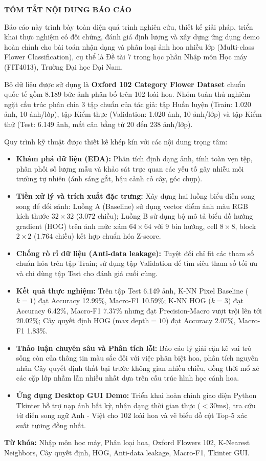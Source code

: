 \documentclass[../DoAn.tex]{subfiles}
\begin{document}
\begin{center}
    \Large{\textbf{TÓM TẮT NỘI DUNG BÁO CÁO}}
\end{center}
\vspace{0.8cm}

Báo cáo này trình bày toàn diện quá trình nghiên cứu, thiết kế giải pháp, triển khai thực nghiệm có đối chứng, đánh giá định lượng và xây dựng ứng dụng demo hoàn chỉnh cho bài toán nhận dạng và phân loại ảnh hoa nhiều lớp (Multi-class Flower Classification), cụ thể là Đề tài 7 trong học phần Nhập môn Học máy (FIT4013), Trường Đại học Đại Nam.

Bộ dữ liệu được sử dụng là \textbf{Oxford 102 Category Flower Dataset} chuẩn quốc tế gồm 8.189 bức ảnh phân bố trên 102 loài hoa. Nhóm tuân thủ nghiêm ngặt cấu trúc phân chia 3 tập chuẩn của tác giả: tập Huấn luyện (Train: 1.020 ảnh, 10 ảnh/lớp), tập Kiểm thực (Validation: 1.020 ảnh, 10 ảnh/lớp) và tập Kiểm thử (Test: 6.149 ảnh, mất cân bằng từ 20 đến 238 ảnh/lớp).

Quy trình kỹ thuật được thiết kế khép kín với các nội dung trọng tâm:
\begin{itemize}
    \item \textbf{Khám phá dữ liệu (EDA):} Phân tích định dạng ảnh, tính toàn vẹn tệp, phân phối số lượng mẫu và khảo sát trực quan các yếu tố gây nhiễu môi trường tự nhiên (ánh sáng gắt, hậu cảnh cỏ cây, góc chụp).
    \item \textbf{Tiền xử lý và trích xuất đặc trưng:} Xây dựng hai luồng biểu diễn song song để đối sánh: Luồng A (Baseline) sử dụng vector điểm ảnh màu RGB kích thước $32\times32$ ($3.072$ chiều); Luồng B sử dụng bộ mô tả biểu đồ hướng gradient (HOG) trên ảnh mức xám $64\times64$ với 9 bin hướng, cell $8\times8$, block $2\times2$ ($1.764$ chiều) kết hợp chuẩn hóa Z-score.
    \item \textbf{Chống rò rỉ dữ liệu (Anti-data leakage):} Tuyệt đối chỉ fit các tham số chuẩn hóa trên tập Train; sử dụng tập Validation để tìm siêu tham số tối ưu và chỉ dùng tập Test cho đánh giá cuối cùng.
    \item \textbf{Kết quả thực nghiệm:} Trên tập Test 6.149 ảnh, K-NN Pixel Baseline ($k=1$) đạt Accuracy 12.99\%, Macro-F1 10.59\%; K-NN HOG ($k=3$) đạt Accuracy 6.42\%, Macro-F1 7.37\% nhưng đạt Precision-Macro vượt trội lên tới 20.02\%; Cây quyết định HOG ($\text{max\_depth}=10$) đạt Accuracy 2.07\%, Macro-F1 1.83\%.
    \item \textbf{Thảo luận chuyên sâu và Phân tích lỗi:} Báo cáo lý giải cặn kẽ vai trò sống còn của thông tin màu sắc đối với việc phân biệt hoa, phân tích nguyên nhân Cây quyết định thất bại trước không gian nhiều chiều, đồng thời mổ xẻ các cặp lớp nhầm lẫn nhiều nhất dựa trên cấu trúc hình học cánh hoa.
    \item \textbf{Ứng dụng Desktop GUI Demo:} Triển khai hoàn chỉnh giao diện Python Tkinter hỗ trợ nạp ảnh bất kỳ, nhận dạng thời gian thực ($<30\text{ms}$), tra cứu từ điển song ngữ Anh - Việt cho 102 loài hoa và vẽ biểu đồ cột Top-5 xác suất tương đồng nhất.
\end{itemize}

\textbf{Từ khóa:} Nhập môn học máy, Phân loại hoa, Oxford Flowers 102, K-Nearest Neighbors, Cây quyết định, HOG, Anti-data leakage, Macro-F1, Tkinter GUI.
\end{document}
